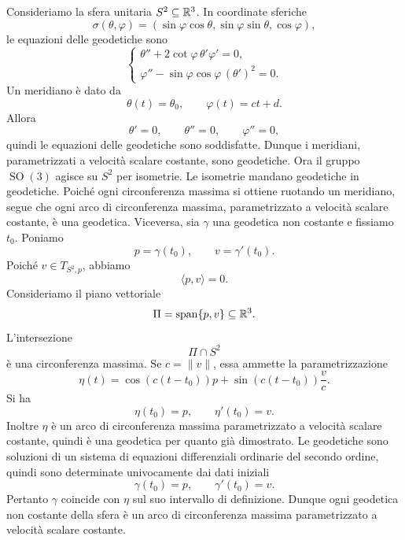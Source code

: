 \documentclass[a4paper]{article}
\begin{document}
\begin{snippetproof}{}
    Consideriamo la sfera unitaria \(S^2\subseteq\mathbb{R}^3\). In coordinate sferiche
    \[
        \sigma(\theta,\varphi)
        =
        (\sin\varphi\cos\theta,\sin\varphi\sin\theta,\cos\varphi),
    \]
    le equazioni delle geodetiche sono
    \[
        \begin{cases}
            \theta''+2\cot\varphi\,\theta'\varphi'=0,\\
            \varphi''-\sin\varphi\cos\varphi\,(\theta')^2=0.
        \end{cases}
    \]
    Un meridiano è dato da
    \[
        \theta(t)=\theta_0,
        \qquad
        \varphi(t)=ct+d.
    \]
    Allora
    \[
        \theta'=0,
        \qquad
        \theta''=0,
        \qquad
        \varphi''=0,
    \]
    quindi le equazioni delle geodetiche sono soddisfatte. Dunque i meridiani, parametrizzati a velocità scalare costante, sono geodetiche.
    Ora il gruppo \(\operatorname{SO}(3)\) agisce su \(S^2\) per isometrie. Le isometrie mandano geodetiche in geodetiche. Poiché ogni circonferenza massima si ottiene ruotando un meridiano, segue che ogni arco di circonferenza massima, parametrizzato a velocità scalare costante, è una geodetica.
    Viceversa, sia \(\gamma\) una geodetica non costante e fissiamo \(t_0\). Poniamo
    \[
        p=\gamma(t_0),
        \qquad
        v=\gamma'(t_0).
    \]
    Poiché \(v\in T_{S^2,p}\), abbiamo
    \[
        \langle p,v\rangle=0.
    \]
    Consideriamo il piano vettoriale
    \[
        \Pi=\operatorname{span}\{p,v\}\subseteq\mathbb{R}^3.
    \]
    L'intersezione
    \[
        \Pi\cap S^2
    \]
    è una circonferenza massima. Se \(c=\|v\|\), essa ammette la parametrizzazione
    \[
        \eta(t)
        =
        \cos(c(t-t_0))p
        +
        \sin(c(t-t_0))\frac{v}{c}.
    \]
    Si ha
    \[
        \eta(t_0)=p,
        \qquad
        \eta'(t_0)=v.
    \]
    Inoltre \(\eta\) è un arco di circonferenza massima parametrizzato a velocità scalare costante, quindi è una geodetica per quanto già dimostrato.
    Le geodetiche sono soluzioni di un sistema di equazioni differenziali ordinarie del secondo ordine, quindi sono determinate univocamente dai dati iniziali
    \[
        \gamma(t_0)=p,
        \qquad
        \gamma'(t_0)=v.
    \]
    Pertanto \(\gamma\) coincide con \(\eta\) sul suo intervallo di definizione. Dunque ogni geodetica non costante della sfera è un arco di circonferenza massima parametrizzato a velocità scalare costante.
\end{snippetproof}
\end{document}
